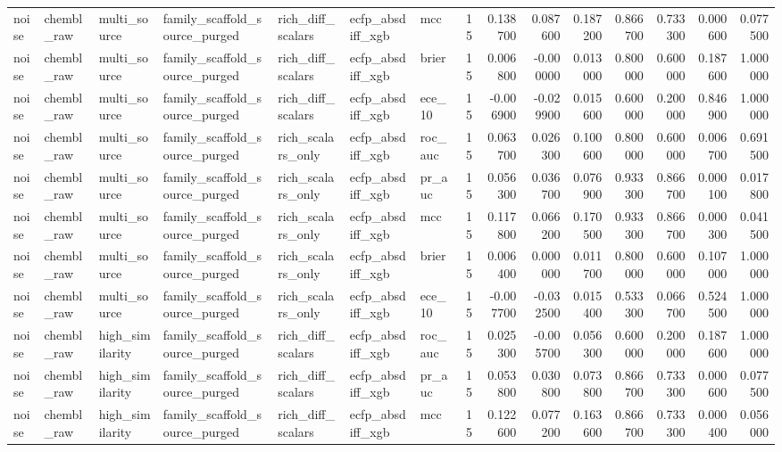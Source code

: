 \begin{longtable}{lllllllrrrrrrrr}
noise & chembl\_raw & multi\_source & family\_scaffold\_source\_purged & rich\_diff\_scalars & ecfp\_absdiff\_xgb & mcc & 15 & 0.138700 & 0.087600 & 0.187200 & 0.866700 & 0.733300 & 0.000600 & 0.077500 \\
noise & chembl\_raw & multi\_source & family\_scaffold\_source\_purged & rich\_diff\_scalars & ecfp\_absdiff\_xgb & brier & 15 & 0.006800 & -0.000000 & 0.013000 & 0.800000 & 0.600000 & 0.187600 & 1.000000 \\
noise & chembl\_raw & multi\_source & family\_scaffold\_source\_purged & rich\_diff\_scalars & ecfp\_absdiff\_xgb & ece\_10 & 15 & -0.006900 & -0.029900 & 0.015600 & 0.600000 & 0.200000 & 0.846900 & 1.000000 \\
noise & chembl\_raw & multi\_source & family\_scaffold\_source\_purged & rich\_scalars\_only & ecfp\_absdiff\_xgb & roc\_auc & 15 & 0.063700 & 0.026300 & 0.100600 & 0.800000 & 0.600000 & 0.006700 & 0.691500 \\
noise & chembl\_raw & multi\_source & family\_scaffold\_source\_purged & rich\_scalars\_only & ecfp\_absdiff\_xgb & pr\_auc & 15 & 0.056300 & 0.036700 & 0.076900 & 0.933300 & 0.866700 & 0.000100 & 0.017800 \\
noise & chembl\_raw & multi\_source & family\_scaffold\_source\_purged & rich\_scalars\_only & ecfp\_absdiff\_xgb & mcc & 15 & 0.117800 & 0.066200 & 0.170500 & 0.933300 & 0.866700 & 0.000300 & 0.041500 \\
noise & chembl\_raw & multi\_source & family\_scaffold\_source\_purged & rich\_scalars\_only & ecfp\_absdiff\_xgb & brier & 15 & 0.006400 & 0.000000 & 0.011700 & 0.800000 & 0.600000 & 0.107000 & 1.000000 \\
noise & chembl\_raw & multi\_source & family\_scaffold\_source\_purged & rich\_scalars\_only & ecfp\_absdiff\_xgb & ece\_10 & 15 & -0.007700 & -0.032500 & 0.015400 & 0.533300 & 0.066700 & 0.524500 & 1.000000 \\
noise & chembl\_raw & high\_similarity & family\_scaffold\_source\_purged & rich\_diff\_scalars & ecfp\_absdiff\_xgb & roc\_auc & 15 & 0.025300 & -0.005700 & 0.056300 & 0.600000 & 0.200000 & 0.187600 & 1.000000 \\
noise & chembl\_raw & high\_similarity & family\_scaffold\_source\_purged & rich\_diff\_scalars & ecfp\_absdiff\_xgb & pr\_auc & 15 & 0.053800 & 0.030800 & 0.073800 & 0.866700 & 0.733300 & 0.000600 & 0.077500 \\
noise & chembl\_raw & high\_similarity & family\_scaffold\_source\_purged & rich\_diff\_scalars & ecfp\_absdiff\_xgb & mcc & 15 & 0.122600 & 0.077200 & 0.163600 & 0.866700 & 0.733300 & 0.000400 & 0.056000 \\

\end{longtable}
